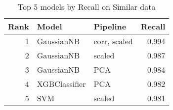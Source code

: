 \begin{table}[!htb]
\centering
\begin{tabular}{rllr}
\toprule
Rank & Model & Pipeline & Recall \\
\midrule
1 & GaussianNB & corr, scaled & 0.994 \\
2 & GaussianNB & scaled & 0.987 \\
3 & GaussianNB & PCA & 0.984 \\
4 & XGBClassifier & PCA & 0.982 \\
5 & SVM & scaled & 0.981 \\
\bottomrule
\end{tabular}
\caption{Top 5 models by Recall on Similar data}
\label{table-top-5-recall-similar}
\end{table}
